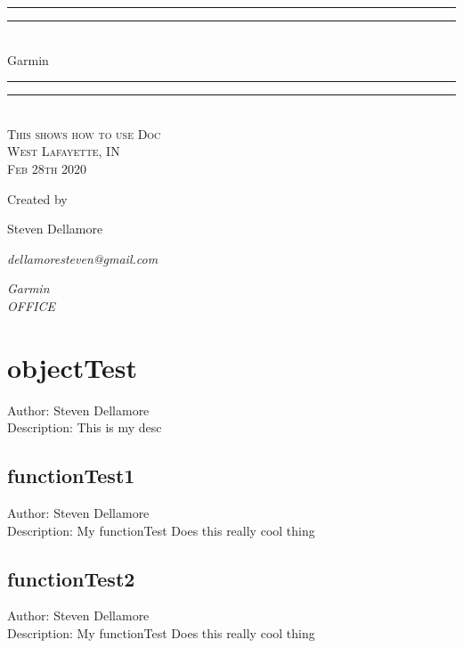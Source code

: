 \documentclass[12pt]{article}
\newlength{\drop}
\begin{document}
  \begin{titlepage}
    \centering
    \textheight
    \vspace*{7\baselineskip}
    \rule{\textwidth}{1.6pt}\vspace*{-\baselineskip}\vspace*{2pt}
    \rule{\textwidth}{0.4pt}\\[\baselineskip]
    {\LARGE Garmin}\\[0.2\baselineskip]
    \rule{\textwidth}{0.4pt}\vspace*{-\baselineskip}\vspace{3.2pt}
    \rule{\textwidth}{1.6pt}\\[\baselineskip]
    \scshape
    This shows how to use Doc \\
    West Lafayette, IN \\
    Feb 28th 2020\par
    \vspace*{2\baselineskip}
    Created by \\[\baselineskip]
    {\Large Steven Dellamore\par}
    {\itshape dellamoresteven@gmail.com\par}
    {\itshape Garmin \\ OFFICE\par}
  \end{titlepage}
  
\tableofcontents
\newpage


\section{objectTest}
Author: Steven Dellamore \\
Description: This is my desc \\



\subsection{functionTest1}
Author: Steven Dellamore \\
Description: My functionTest Does this really cool thing \\



\subsection{functionTest2}
Author: Steven Dellamore \\
Description: My functionTest Does this really cool thing \\
\end{document}
